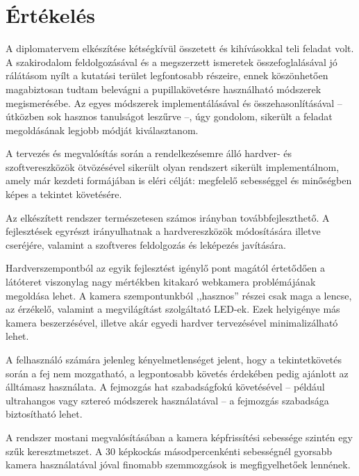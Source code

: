 \chapter*{Értékelés}\label{sect:ertekeles}

A diplomatervem elkészítése kétségkívül összetett és kihívásokkal teli feladat volt. A szakirodalom feldolgozásával és a megszerzett ismeretek összefoglalásával jó rálátásom nyílt a kutatási terület legfontosabb részeire, ennek köszönhetően magabiztosan tudtam belevágni a pupillakövetésre használható módszerek megismerésébe. Az egyes módszerek implementálásával és összehasonlításával -- útközben sok hasznos tanulságot leszűrve --, úgy gondolom, sikerült a feladat megoldásának legjobb módját kiválasztanom.

A tervezés és megvalósítás során a rendelkezésemre álló hardver- és szoftvereszközök ötvözésével sikerült olyan rendszert sikerült implementálnom, amely már kezdeti formájában is eléri célját: megfelelő sebességgel és minőségben képes a tekintet követésére.

\bigskip

Az elkészített rendszer természetesen számos irányban továbbfejleszthető. A fejlesztések egyrészt irányulhatnak a hardvereszközök módosítására illetve cseréjére, valamint a szoftveres feldolgozás és leképezés javítására.

Hardverszempontból az egyik fejlesztést igénylő pont magától értetődően a látóteret viszonylag nagy mértékben kitakaró webkamera problémájának megoldása lehet. A kamera szempontunkból ,,hasznos'' részei csak maga a lencse, az érzékelő, valamint a megvilágítást szolgáltató LED-ek. Ezek helyigénye más kamera beszerzésével, illetve akár egyedi hardver tervezésével minimalizálható lehet.

A felhasználó számára jelenleg kényelmetlenséget jelent, hogy a tekintetkövetés során a fej nem mozgatható, a legpontosabb követés érdekében pedig ajánlott az álltámasz használata. A fejmozgás hat szabadságfokú követésével -- például ultrahangos vagy sztereó módszerek használatával -- a fejmozgás szabadsága biztosítható lehet. 

A rendszer mostani megvalósításában a kamera képfrissítési sebessége szintén egy szűk keresztmetszet. A 30 képkockás másodpercenkénti sebességnél gyorsabb kamera használatával jóval finomabb szemmozgások is megfigyelhetőek lennének.

